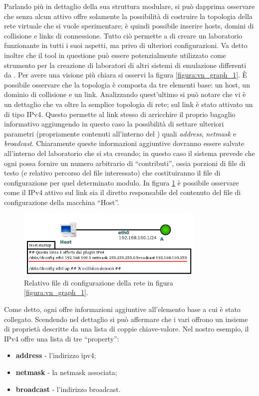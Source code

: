 Parlando più in dettaglio della sua struttura modulare, si può dapprima osservare che \visualnetkit{} senza alcun \plugin{} attivo offre solamente la possibilità di costruire la topologia della rete virtuale che si vuole sperimentare; è quindi possibile inserire hosts, domini di collisione e links di connessione. Tutto ciò permette a \visualnetkit{} di creare un laboratorio funzionante in tutti i suoi aspetti, ma privo di ulteriori configurazioni. Va detto inoltre che il tool in questione può essere potenzialmente utilizzato come strumento per la creazione di laboratori di altri sistemi di emulazione differenti da \netkit{}.
Per avere una visione più chiara si osservi la figura \ref{figura:vn_graph_1}. È possibile osservare che la topologia è composta da tre elementi base: un host, un dominio di collisione e un link. Analizzando quest'ultimo si può notare che vi è un dettaglio che va oltre la semplice topologia di rete; sul link è stato attivato un \plugin{} di tipo IPv4. Questo permette al link stesso di arricchire il proprio bagaglio informativo aggiungendo in questo caso la possibilità di settare ulteriori parametri (propriamente contenuti all'interno del \plugin{}) quali \emph{address}, \emph{netmask} e \emph{broadcast}. Chiaramente queste informazioni aggiuntive dovranno essere salvate all'interno del laboratorio che si sta creando; in questo caso il sistema prevede che ogni \plugin{} possa fornire un numero arbitrario di ``contributi'', ossia porzioni di file di testo (e relativo percorso del file interessato) che costituiranno il file di configurazione per quel determinato modulo. In figura \ref{figura:vn_graph_2} è possibile osservare come il \plugin{} IPv4 attivo sul link sia il diretto responsabile del contenuto del file di configurazione della macchina ``Host''.

\begin{figure}[!ht]
	\centering
	\includegraphics[width=9cm]{images/visualnetkit_graph_2.png}
	\caption{Relativo file di configurazione della rete in figura \ref{figura:vn_graph_1}.}
	\label{figura:vn_graph_2}
\end{figure}

Come detto, ogni \plugin{} offre informazioni aggiuntive all'elemento base a cui è stato collegato. Scendendo nel dettaglio si può affermare che i vari \plugin{} offrono un insieme di proprietà descritte da una lista di coppie chiave-valore. Nel nostro esempio, il \plugin{} IPv4 offre una lista di tre ``property'':
\begin{itemize}
	\item \textbf{address} - l'indirizzo ipv4;
	\item \textbf{netmask} - la netmask associata;
	\item \textbf{broadcast} - l'indirizzo broadcast.
\end{itemize}

